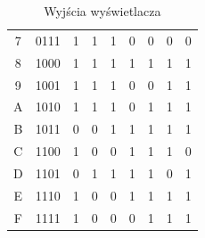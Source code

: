 \documentclass{article}
\begin{document}
\begin{center}
\begin{table}[ht]
\begin{tabularx}{\textwidth}{|c|c| *{7}{Y|}}
                         7 & 0111 & 1 & 1 & 1 & 0 & 0 & 0 & 0\\
                         8 & 1000 & 1 & 1 & 1 & 1 & 1 & 1 & 1\\
                         9 & 1001 & 1 & 1 & 1 & 0 & 0 & 1 & 1\\
                         A & 1010 & 1 & 1 & 1 & 0 & 1 & 1 & 1\\
                         B & 1011 & 0 & 0 & 1 & 1 & 1 & 1 & 1\\ 
                         C & 1100 & 1 & 0 & 0 & 1 & 1 & 1 & 0\\
                         D & 1101 & 0 & 1 & 1 & 1 & 1 & 0 & 1\\
                         E & 1110 & 1 & 0 & 0 & 1 & 1 & 1 & 1\\
                         F & 1111 & 1 & 0 & 0 & 0 & 1 & 1 & 1\\
                        \hline
                    \end{tabularx}
                    \caption{Wyjścia wyświetlacza}
                    \label{tab:my_label}
                \end{table}
            \end{center}
            \FloatBarrier
            
\end{document}
